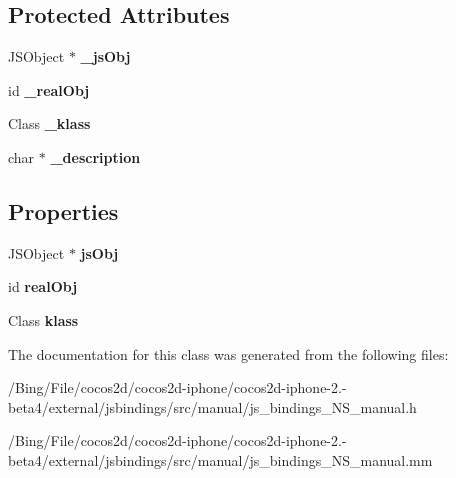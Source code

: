 \subsection*{Protected Attributes}
\begin{DoxyCompactItemize}
\item 
\hypertarget{interface_j_s_b___n_s_object_a6567a043a7a1d7d5728e6782a690b305}{J\-S\-Object $\ast$ {\bfseries \-\_\-js\-Obj}}\label{interface_j_s_b___n_s_object_a6567a043a7a1d7d5728e6782a690b305}

\item 
\hypertarget{interface_j_s_b___n_s_object_a05c6a92c12ea7306f6be896d2dbcf457}{id {\bfseries \-\_\-real\-Obj}}\label{interface_j_s_b___n_s_object_a05c6a92c12ea7306f6be896d2dbcf457}

\item 
\hypertarget{interface_j_s_b___n_s_object_aeb7a4f722db4c7bd34cf92d4a209c0ce}{Class {\bfseries \-\_\-klass}}\label{interface_j_s_b___n_s_object_aeb7a4f722db4c7bd34cf92d4a209c0ce}

\item 
\hypertarget{interface_j_s_b___n_s_object_a0e2c9c7e25e4d5bb6a1f8b5c51b40589}{char $\ast$ {\bfseries \-\_\-description}}\label{interface_j_s_b___n_s_object_a0e2c9c7e25e4d5bb6a1f8b5c51b40589}

\end{DoxyCompactItemize}
\subsection*{Properties}
\begin{DoxyCompactItemize}
\item 
\hypertarget{interface_j_s_b___n_s_object_a899102c9d107a74450281500cb3a895a}{J\-S\-Object $\ast$ {\bfseries js\-Obj}}\label{interface_j_s_b___n_s_object_a899102c9d107a74450281500cb3a895a}

\item 
\hypertarget{interface_j_s_b___n_s_object_a361ee6641ce88c4c865895909cdf8865}{id {\bfseries real\-Obj}}\label{interface_j_s_b___n_s_object_a361ee6641ce88c4c865895909cdf8865}

\item 
\hypertarget{interface_j_s_b___n_s_object_ae24d89e81faa5813f56315da15ca5638}{Class {\bfseries klass}}\label{interface_j_s_b___n_s_object_ae24d89e81faa5813f56315da15ca5638}

\end{DoxyCompactItemize}


The documentation for this class was generated from the following files\-:\begin{DoxyCompactItemize}
\item 
/\-Bing/\-File/cocos2d/cocos2d-\/iphone/cocos2d-\/iphone-\/2.-\/beta4/external/jsbindings/src/manual/js\-\_\-bindings\-\_\-\-N\-S\-\_\-manual.\-h\item 
/\-Bing/\-File/cocos2d/cocos2d-\/iphone/cocos2d-\/iphone-\/2.-\/beta4/external/jsbindings/src/manual/js\-\_\-bindings\-\_\-\-N\-S\-\_\-manual.\-mm\end{DoxyCompactItemize}
